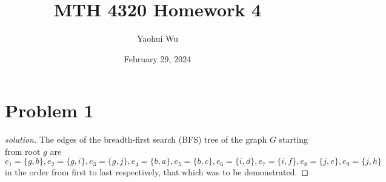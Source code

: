 \documentclass[12pt]{article}
\title{MTH 4320 Homework 4}
\author{Yaohui Wu}
\date{February 29, 2024}
\newenvironment*{solution}{\begin{proof}[solution]}{\end{proof}}
\begin{document}
\maketitle
\section*{Problem 1}
\begin{solution}
    The edges of the breadth-first search (BFS) tree of the graph \(G\)
    starting from root \(g\) are \(e_1=\{g,b\},e_2=\{g,i\},e_3=\{g,j\},e_4=\{
        b,a\},e_5=\{b,c\},e_6=\{i,d\},e_7=\{i,f\},e_8=\{j,e\},e_9=\{j,h\}\) in
        the order from first to last respectively, that which was to be
        demonstrated.
\end{solution}
\end{document}
